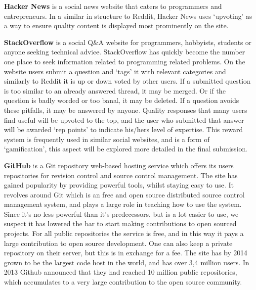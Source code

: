 \documentclass[a4paper,11pt]{scrartcl}
\begin{document}
\textbf{Hacker News} is a social news website that caters to programmers and
entrepreneurs. In a similar in structure to Reddit, Hacker News uses
‘upvoting’ as a way to ensure quality content is displayed most prominently
on the site.


\textbf{StackOverflow} is a social Q\&A website for programmers, hobbyists,
students or anyone seeking technical advice. StackOverflow has quickly
become the number one place to seek information related to programming
related problems. On the website users submit a question and ‘tags’ it with
relevant categories and similarly to Reddit it is up or down voted by other
users. If a submitted question is too similar to an already answered thread,
it may be merged. Or if the question is badly worded or too banal, it may be
deleted. If a question avoids these pitfalls, it may be answered by
anyone. Quality responses that many users find useful will be upvoted to the
top, and the user who submitted that answer will be awarded ‘rep points’ to
indicate his/hers level of expertise. This reward system is frequently used
in similar social websites, and is a form of ‘gamification’, this aspect
will be explored more detailed in the final submission.


\textbf{GitHub} is a Git repository web-based hosting service which offers
its users repositories for revision control and source control
management. The site has gained popularity by providing powerful tools,
whilst staying easy to use. It revolves around Git which is an free and open
source distributed source control management system, and plays a large role
in teaching how to use the system. Since it’s no less powerful than it’s
predecessors, but is a lot easier to use, we suspect it has lowered the bar
to start making contributions to open sourced projects. For all public
repositories the service is free, and in this way it pays a large
contribution to open source development. One can also keep a private
repository on their server, but this is in exchange for a fee. The site has
by 2014 grown to be the largest code host in the world, and has over 3,4
million users. In 2013 Github announced that they had reached 10 million
public repositories, which accumulates to a very large contribution to the
open source community.

 
\end{document}
